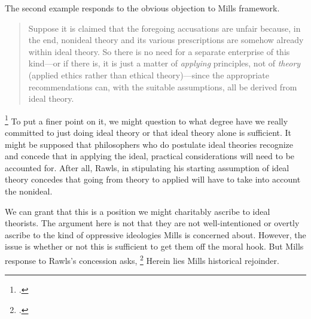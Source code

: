 \documentclass[letterpaper,notitlepage,12pt]{article}
\begin{document}
The second example responds to the obvious objection to Mills framework.
\blockquote{Suppose it is claimed that the
  foregoing accusations are unfair because, in the end, nonideal theory and its
  various prescriptions are somehow already  within ideal
  theory. So there is no need for a separate enterprise of this kind---or if
  there is, it is just a matter of \textit{applying} principles, not of
\textit{theory} (applied ethics rather than ethical theory)---since the
appropriate recommendations can, with the suitable assumptions, all be derived
from ideal theory.}\footcite[p. 177]{mills_ideal_2005}
To put a finer point on it, we might question to what degree have we really
committed to just doing ideal theory or that ideal theory alone is sufficient.
It might be supposed that philosophers who do postulate ideal theories recognize
and concede that in applying the ideal, practical considerations will need to be
accounted for.
After all, Rawls, in stipulating his starting assumption of ideal theory
concedes that going from theory to applied will have to take into account the
nonideal.

We can grant that this is a position we might charitably ascribe to ideal
theorists.
The argument here is not that they are not well-intentioned or overtly ascribe
to the kind of oppressive ideologies Mills is concerned about.
However, the issue is whether or not this is sufficient to get them off the
moral hook.
But Mills response to Rawls's concession asks, \footcite[p.
179]{mills_ideal_2005}
Herein lies Mills historical rejoinder.
\end{document}
